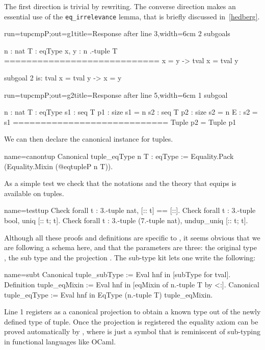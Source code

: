 The first direction is trivial by rewriting.
The converse direction makes an essential use of
the \lstinline/eq_irrelevance/ lemma, that is briefly discussed
in~\ref{hedberg}.

\begin{coqout}{run=tupcmpP;out=g1}{title=Response after line 3,width=6cm}
2 subgoals

n : nat
T : eqType
x, y : n .-tuple T
============================
x = y -> tval x = tval y

subgoal 2 is:
  tval x = tval y -> x = y
$~$  
\end{coqout}
\begin{coqout}{run=tupcmpP;out=g2}{title=Response after line 5,width=6cm}
1 subgoal

n : nat
T : eqType
s1 : seq T
p1 : size s1 = n
s2 : seq T
p2 : size s2 = n
E : s2 = s1
============================
Tuple p2 = Tuple p1
\end{coqout}

We can then declare the canonical  instance for tuples.

\begin{coq}{name=canontup}{}
Canonical tuple_eqType n T : eqType :=
  Equality.Pack (Equality.Mixin (@eqtupleP n T)).
\end{coq}

As a simple test we check that the notations and the theory
that equips  is available on tuples.

\begin{coq}{name=testtup}{}
Check forall t : 3.-tuple nat, [:: t] == [::].
Check forall t : 3.-tuple bool, uniq [:: t; t].
Check forall t : 3.-tuple (7.-tuple nat), undup_uniq [:: t; t].
\end{coq}

Although all these proofs and definitions are specific to ,
it seems obvious that we are following a schema here, and that the
parameters are three: the original type , the sub type
 and the projection .
The sub-type kit lets one write the following:

\begin{coq}{name=subt}{}
Canonical tuple_subType := Eval hnf in [subType for tval].
Definition tuple_eqMixin := Eval hnf in [eqMixin of n.-tuple T by <:].
Canonical tuple_eqType := Eval hnf in EqType (n.-tuple T) tuple_eqMixin.
\end{coq}

Line 1 registers  as a canonical projection to obtain a known
type out of the newly defined type of tuple.  Once the projection
is registered the equality axiom can be proved automatically by
, where \C{<:} is just a symbol
that is reminiscent of sub-typing in functional languages like OCaml.


